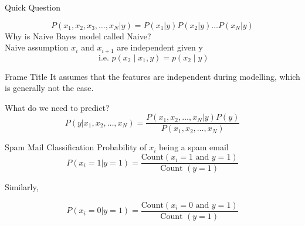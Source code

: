 \documentclass{beamer}
\begin{document}
\begin{frame}{Quick Question}
    
    
    \pause \begin{equation*}
        P(x_{1},x_{2},x_{3},\dots,x_{N} \vert y) = P(x_{1}|y) P(x_{2}|y) \dots P(x_{N}|y)
    \end{equation*}
    \pause Why is Naive Bayes model called Naive? \\

    \pause Naive assumption $x_{i}$ and $x_{i+1}$ are independent given y
    \[
    \text { i.e. }  p\left(x_{2} \mid x_{1}, y\right)=p\left(x_{2} \mid y\right)
    \]

\end{frame}


\begin{frame}{Frame Title}
    It assumes that the features are independent during modelling, which is generally not the case.
\end{frame}

\begin{frame}{What do we need to predict?}
    \begin{equation*}
        P(y|x_{1},x_{2},\dots,x_{N}) =  \frac{P(x_{1},x_{2},\dots,x_{N}|y)P(y)}{P(x_{1},x_{2},\dots,x_{N})}
    \end{equation*}
\end{frame}


\begin{frame}{Spam Mail Classification}
    Probability of $x_{i}$ being a spam email\\
    $$
    P(x_{i} = 1|y = 1) = \frac{\text{Count} (x_{i} = 1 \text{ and } y = 1)}{\text{Count }(y=1)}
    $$
    
    Similarly,
    
    $$
    P(x_{i} = 0|y = 1) = \frac{\text{Count} (x_{i} = 0 \text{ and } y = 1)}{\text{Count }(y=1)}
    $$
    
    
\end{frame}
\end{document}
